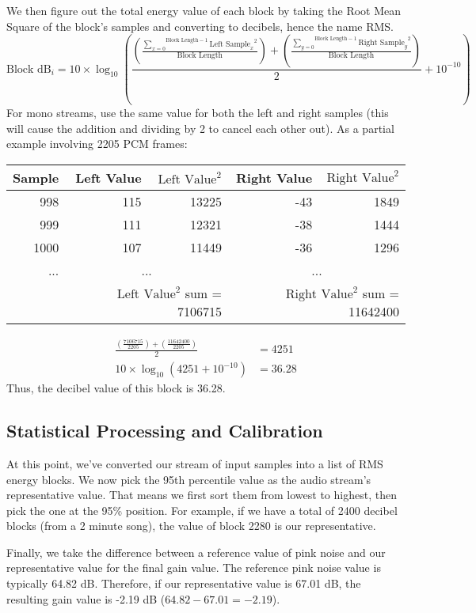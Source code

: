 We then figure out the total energy value of each block by taking
the Root Mean Square of the block's samples and converting to decibels,
hence the name RMS.
{
\begin{equation}
\text{Block dB}_i = 10 \times \log_{10} \left (
\frac{\left ( \frac{\overset{\text{Block Length} - 1}{\underset{x = 0}{\sum}} {\text{Left Sample}_x} ^ 2}{\text{Block Length}} \right ) + \left ( \frac{\overset{\text{Block Length} - 1}{\underset{y = 0}{\sum}} {\text{Right Sample}_y} ^ 2}{\text{Block Length}} \right ) }{2} + 10 ^ {-10} \right )
\end{equation}
}
For mono streams, use the same value for both the left and right samples
(this will cause the addition and dividing by 2 to cancel each other out).
As a partial example involving 2205 PCM frames:
\begin{table}[h]
\begin{tabular}{|r|r|r|r|r|}
\hline
Sample & Left Value & $\text{Left Value} ^ 2$ & Right Value & $\text{Right Value} ^ 2$ \\
\hline
998 & 115 & 13225 & -43 & 1849 \\
999 & 111 & 12321 & -38 & 1444 \\
1000 & 107 & 11449 & -36 & 1296 \\
... & \multicolumn{2}{c|}{...} & \multicolumn{2}{c|}{...} \\
\hline
& \multicolumn{2}{r|}{$\text{Left Value} ^ 2$ sum = 7106715} &
\multicolumn{2}{r|}{$\text{Right Value} ^ 2$ sum = 11642400} \\
\hline
\end{tabular}
\end{table}
\begin{align}
\frac{(\frac{7106715}{2205}) + (\frac{11642400}{2205})}{2} &= 4251 \\
10 \times \log_{10}(4251 + 10 ^ {-10} ) &= 36.28
\end{align}
Thus, the decibel value of this block is 36.28.

\subsection{Statistical Processing and Calibration}
At this point, we've converted our stream of input samples into a
list of RMS energy blocks.
We now pick the 95th percentile value as the audio stream's representative
value.
That means we first sort them from lowest to highest, then pick the one at the
95\% position.
For example, if we have a total of 2400 decibel blocks (from a 2 minute song),
the value of block 2280 is our representative.

Finally, we take the difference between a reference value of pink noise
and our representative value for the final gain value.
The reference pink noise value is typically 64.82 dB.
Therefore, if our representative value is 67.01 dB, the resulting
gain value is -2.19 dB ($64.82 - 67.01 = -2.19$).
